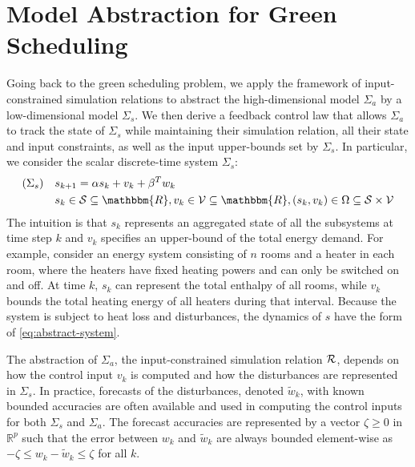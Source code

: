 \section{Model Abstraction for Green\\Scheduling}
\label{sec:abstraction-gs}


Going back to the green scheduling problem, we apply the framework of input-constrained simulation relations to abstract the high-dimensional model $\Sigma_{a}$ by a low-dimensional model $\Sigma_{s}$.
We then derive a feedback control law that allows $\Sigma_{a}$ to track the state of $\Sigma_{s}$ while maintaining their simulation relation, all their state and input constraints, as well as the input upper-bounds set by $\Sigma_{s}$.
In particular, we consider the scalar discrete-time system $\Sigma_{s}$:
\begin{align}
  (\Sigma_s) \quad
  & s_{k + 1} = \alpha s_k + v_k + \beta^T w_{k}   \label{eq:abstract-system} \\
  & s_k \in \SSet \subseteq \mathbbm{R},
  v_k \in \VSet \subseteq \mathbbm{R},
  (s_k, v_k) \in \Omega \subseteq \SSet \times \VSet \nonumber
 \end{align}
%
The intuition is that $s_{k}$ represents an aggregated state of all the subsystems at time step $k$ and $v_{k}$ specifies an upper-bound of the total energy demand.
For example, consider an energy system consisting of $n$ rooms and a heater in each room, where the heaters have fixed heating powers and can only be switched on and off.
At time $k$, $s_{k}$ can represent the total enthalpy of all rooms, while $v_{k}$ bounds the total heating energy of all heaters during that interval.
Because the system is subject to heat loss and disturbances, the dynamics of $s$ have the form of \eqref{eq:abstract-system}.

The abstraction of $\Sigma_{a}$, \ie the input-constrained simulation relation $\mathcal{R}$, depends on how the control input $v_{k}$ is computed and how the disturbances are represented in $\Sigma_{s}$.
In practice, forecasts of the disturbances, denoted $\tilde{w}_{k}$, with known bounded accuracies are often available and used in computing the control inputs for both $\Sigma_{s}$ and $\Sigma_{a}$.
The forecast accuracies are represented by a vector $\zeta \geq 0$ in $\mathbb{R}^{p}$ such that the error between $w_{k}$ and $\tilde{w}_{k}$ are always bounded element-wise as $-\zeta \leqslant w_{k} - \tilde{w}_{k} \leqslant \zeta$ for all $k$.

